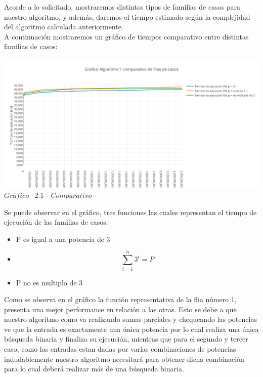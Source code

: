 \indent Acorde a lo solicitado, mostraremos distintos tipos de familias de casos para nuestro algoritmo, y adem\'as, daremos el tiempo estimado 
seg\'un la complejidad del algoritmo calculada anteriormente.\\

A continuaci\'on mostraremos un gr\'afico de tiempos comparativo entre distintas familias de casos:\\ 

\vspace*{0.3cm} \vspace*{0.3cm}
  \begin{center}
 \includegraphics[scale=0.65]{./EJ2/comparativo.png}
 {$Gr$\'a$fico$ \ 2.1 - $Comparativo$}
  \end{center}
  \vspace*{0.3cm}
  
Se puede observar en el gr\'afico, tres funciones las cuales representan el tiempo de ejecuci\'on de las familias de casos:\\
\begin{itemize}
\item P es igual a una potencia de 3
\item \[
\sum_{i=1}^{n}3^{i}=P 
\]
\item P no es multiplo de 3
\end{itemize}

Como se observa en el gr\'afico la funci\'on representativa de la flia n\'umero 1, presenta una mejor performance en relaci\'on a las otras. Esto se debe a que nuestro algoritmo como va realizando sumas parciales y chequeando las potencias ve que la entrada es exactamente una \'unica potencia por lo cual realiza una \'unica b\'usqueda binaria y finaliza su ejecuci\'on, mientras que para el segundo y tercer caso, como las entradas estan dadas por varias combinaciones de potencias indudablemente nuestro algoritmo necesitar\'a para obtener dicha combinaci\'on para lo cual deber\'a realizar m\'as de una b\'usqueda binaria.

